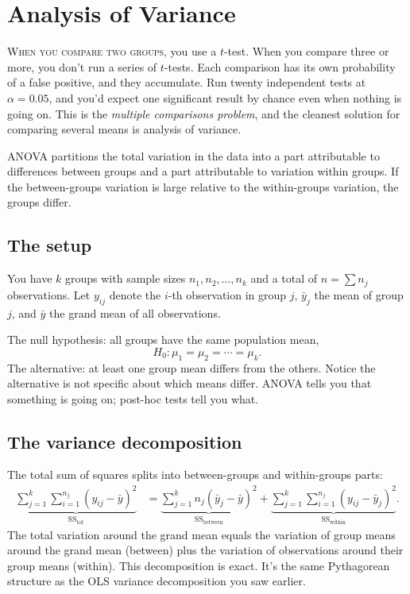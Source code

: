 \chapter{Analysis of Variance}
\label{ch:anova}

\noindent\textsc{When you compare two groups,} you use a $t$-test. When you compare three or more, you don't run a series of $t$-tests. Each comparison has its own probability of a false positive, and they accumulate. Run twenty independent tests at $\alpha = 0.05$, and you'd expect one significant result by chance even when nothing is going on. This is the \emph{multiple comparisons problem}, and the cleanest solution for comparing several means is analysis of variance.

ANOVA partitions the total variation in the data into a part attributable to differences between groups and a part attributable to variation within groups. If the between-groups variation is large relative to the within-groups variation, the groups differ.

\section{The setup}

You have $k$ groups with sample sizes $n_1, n_2, \ldots, n_k$ and a total of $n = \sum n_j$ observations. Let $y_{ij}$ denote the $i$-th observation in group $j$, $\bar y_j$ the mean of group $j$, and $\bar y$ the grand mean of all observations.

The null hypothesis: all groups have the same population mean,
\[
  H_0\colon \mu_1 = \mu_2 = \cdots = \mu_k.
\]
The alternative: at least one group mean differs from the others. Notice the alternative is not specific about which means differ. ANOVA tells you that something is going on; post-hoc tests tell you what.

\section{The variance decomposition}

The total sum of squares splits into between-groups and within-groups parts:
\begin{align}
  \underbrace{\sum_{j=1}^{k}\sum_{i=1}^{n_j}(y_{ij} - \bar y)^2}_{\text{SS}_{\text{tot}}}
  &= \underbrace{\sum_{j=1}^{k} n_j (\bar y_j - \bar y)^2}_{\text{SS}_{\text{between}}}
  + \underbrace{\sum_{j=1}^{k}\sum_{i=1}^{n_j}(y_{ij} - \bar y_j)^2}_{\text{SS}_{\text{within}}}.
  \label{eq:anova-decomp}
\end{align}
The total variation around the grand mean equals the variation of group means around the grand mean (between) plus the variation of observations around their group means (within). This decomposition is exact. It's the same Pythagorean structure as the OLS variance decomposition you saw earlier.

